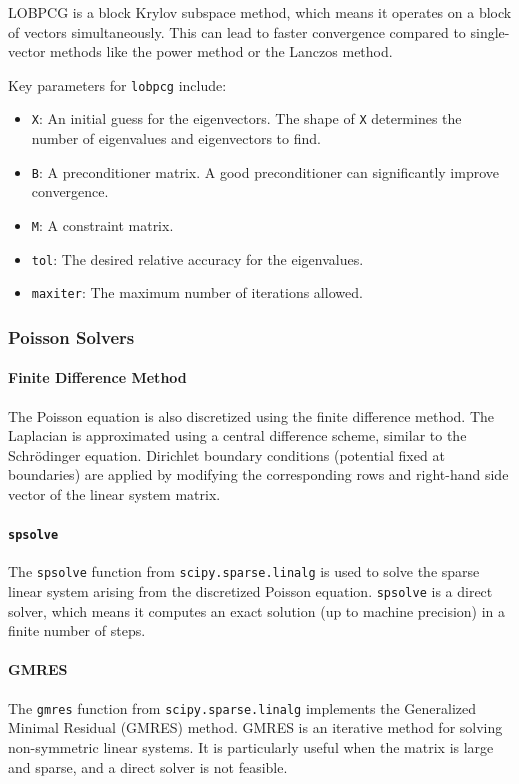 \documentclass{article}
\begin{document}
LOBPCG is a block Krylov subspace method, which means it operates on a block of vectors simultaneously. This can lead to faster convergence compared to single-vector methods like the power method or the Lanczos method.

Key parameters for \texttt{lobpcg} include:
\begin{itemize}
	\item \texttt{X}: An initial guess for the eigenvectors. The shape of \texttt{X} determines the number of eigenvalues and eigenvectors to find.
	\item \texttt{B}: A preconditioner matrix. A good preconditioner can significantly improve convergence.
	\item \texttt{M}: A constraint matrix.
	\item \texttt{tol}: The desired relative accuracy for the eigenvalues.
	\item \texttt{maxiter}: The maximum number of iterations allowed.
\end{itemize}

\subsubsection{Poisson Solvers}

\paragraph{Finite Difference Method}
The Poisson equation is also discretized using the finite difference method. The Laplacian is approximated using a central difference scheme, similar to the Schrödinger equation. Dirichlet boundary conditions (potential fixed at boundaries) are applied by modifying the corresponding rows and right-hand side vector of the linear system matrix.

\paragraph{\texttt{spsolve}}
The \texttt{spsolve} function from \texttt{scipy.sparse.linalg} is used to solve the sparse linear system arising from the discretized Poisson equation. \texttt{spsolve} is a direct solver, which means it computes an exact solution (up to machine precision) in a finite number of steps.

\paragraph{GMRES}
The \texttt{gmres} function from \texttt{scipy.sparse.linalg} implements the Generalized Minimal Residual (GMRES) method. GMRES is an iterative method for solving non-symmetric linear systems. It is particularly useful when the matrix is large and sparse, and a direct solver is not feasible.
\end{document}
